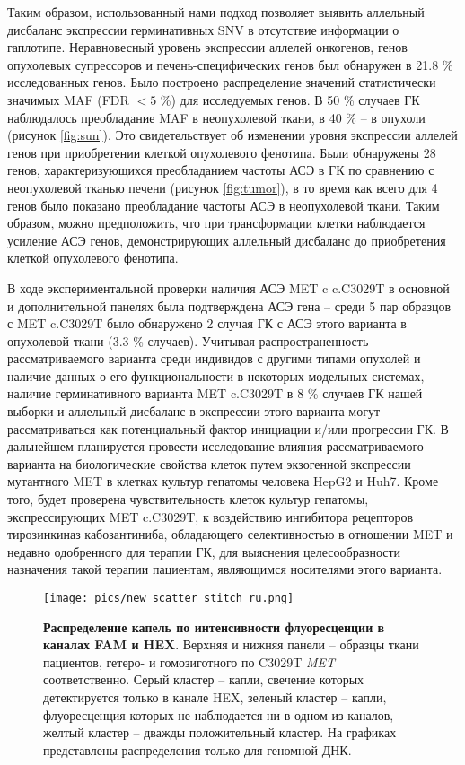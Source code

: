 Таким образом, использованный нами подход позволяет выявить аллельный дисбаланс экспрессии герминативных SNV в отсутствие информации о гаплотипе. Неравновесный уровень экспрессии аллелей онкогенов, генов опухолевых супрессоров и печень-специфических генов был обнаружен в 21.8 \% исследованных генов. Было построено распределение значений статистически значимых MAF (FDR $< 5$ \%) для исследуемых генов. В 50 \% случаев ГК наблюдалось преобладание MAF в неопухолевой ткани, в 40 \% -- в опухоли (рисунок \ref{fig:sun}). Это свидетельствует об изменении уровня экспрессии аллелей генов при приобретении клеткой опухолевого фенотипа. Были обнаружены 28 генов, характеризующихся преобладанием частоты АСЭ в ГК по сравнению с неопухолевой тканью печени (рисунок \ref{fig:tumor}), в то время как всего для 4 генов было показано преобладание частоты АСЭ в неопухолевой ткани. Таким образом, можно предположить, что при трансформации клетки наблюдается усиление АСЭ генов, демонстрирующих аллельный дисбаланс до приобретения клеткой опухолевого фенотипа.

В ходе экспериментальной проверки наличия АСЭ MET c c.C3029T в основной и дополнительной панелях была подтверждена АСЭ гена – среди 5 пар образцов с MET c.C3029T было обнаружено 2 случая ГК с АСЭ этого варианта в опухолевой ткани (3.3 \% случаев). Учитывая распространенность рассматриваемого варианта среди индивидов с другими типами опухолей и наличие данных о его функциональности в некоторых модельных системах, наличие герминативного варианта MET c.C3029T в 8 \% случаев ГК нашей выборки и аллельный дисбаланс в экспрессии этого варианта могут рассматриваться как потенциальный фактор инициации и/или прогрессии ГК. В дальнейшем планируется провести исследование влияния рассматриваемого варианта на биологические свойства клеток путем экзогенной экспрессии мутантного MET в клетках культур гепатомы человека HepG2 и Huh7. Кроме того, будет проверена чувствительность клеток культур гепатомы, экспрессирующих MET c.C3029T, к воздействию ингибитора рецепторов тирозинкиназ кабозантиниба, обладающего селективностью в отношении MET и недавно одобренного для терапии ГК, для выяснения целесообразности назначения такой терапии пациентам, являющимся носителями этого варианта.

\begin{figure}[H]
	\centering
	\texttt{[image: pics/new\_scatter\_stitch\_ru.png]}
	\caption{\textbf{Распределение капель по интенсивности флуоресценции в каналах FAM и HEX}. Верхняя и нижняя панели -- образцы ткани пациентов, гетеро- и гомозиготного по C3029T \textit{MET} соответственно. Серый кластер -- капли, свечение которых детектируется только в канале HEX, зеленый кластер -- капли, флуоресценция которых не наблюдается ни в одном из каналов, желтый кластер -- дважды положительный кластер. На графиках представлены распределения только для геномной ДНК.}
	\label{fig:example}
\end{figure}


